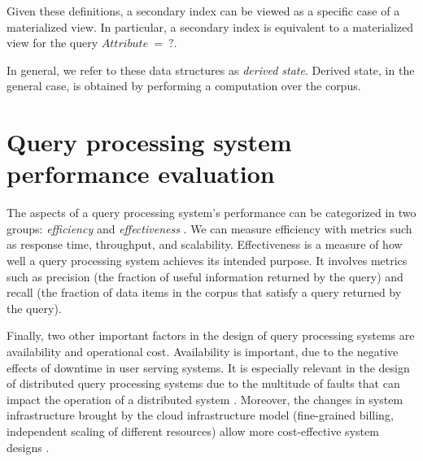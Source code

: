 Given these definitions,
a secondary index can be viewed as a specific case of a materialized view.
In particular, a secondary index is equivalent to a materialized view for the query $Attribute~=~?$.

In general, we refer to these data structures as \textit{derived state}.
Derived state, in the general case, is obtained by performing a computation over the corpus.




\section{Query processing system performance evaluation}
\label{sec:requirements}


The aspects of a query processing system's performance can be categorized in two groups:
\textit{efficiency} and \textit{effectiveness} \cite{buttcher:informationretrieval}.
We can measure efficiency with metrics such as response time, throughput, and scalability.
Effectiveness is a measure of how well a query processing system achieves its intended purpose.
It involves metrics such as precision (the fraction of useful information returned by the query) and recall
(the fraction of data items in the corpus that satisfy a query returned by the query).

Finally, two other important factors in the design of query processing systems are availability and operational cost.
Availability is important, due to the negative effects of downtime in user serving systems.
It is especially relevant in the design of distributed query processing systems due to the multitude of faults that can
impact the operation of a distributed system \cite{kleppmann:designing}.
Moreover, the changes in system infrastructure brought by the cloud infrastructure model
(fine-grained billing, independent scaling of different resources) allow more cost-effective system designs \cite{vuppalapati:elasticqueryengine}.

